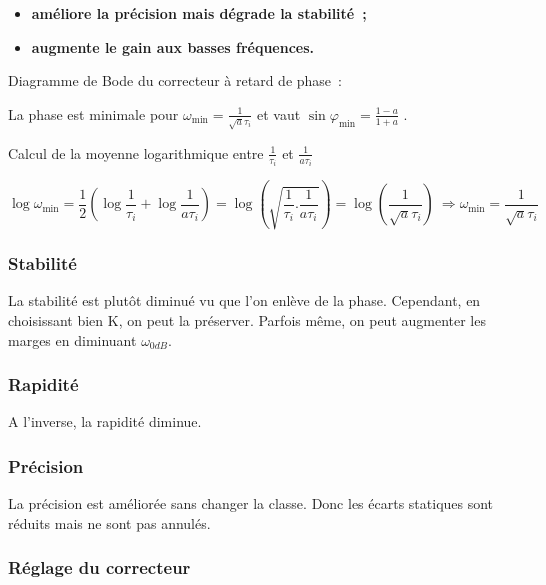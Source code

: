 \begin{itemize}
\item
  \textbf{améliore la précision mais dégrade la stabilité~;}
\item
  \textbf{augmente le gain aux basses fréquences.}
\end{itemize}

Diagramme de Bode du correcteur à retard de phase~:

La phase est minimale pour \(\omega_{\min} = \frac{1}{\sqrt{a}\tau_{i}}\) et vaut \(\sin\varphi_{\min} = \frac{1 - a}{1 + a}\) .

Calcul de la moyenne logarithmique entre \(\frac{1}{\tau_{i}}\) et \(\frac{1}{a\tau_{i}}\)

\[\log\omega_{\min} = \frac{1}{2}\left( \log\frac{1}{\tau_{i}} + \log\frac{1}{a\tau_{i}} \right) = \log\left( \sqrt{\frac{1}{\tau_{i}}.\frac{1}{a\tau_{i}}} \right) = \log\left( \frac{1}{\sqrt{a}\tau_{i}} \right)\  \Rightarrow \omega_{\min} = \frac{1}{\sqrt{a}\tau_{i}}\]

\hypertarget{stabilituxe9-3}{%
\subsubsection*{Stabilité}\label{stabilituxe9-3}}

La stabilité est plutôt diminué vu que l'on enlève de la phase. Cependant, en choisissant bien K, on peut la préserver. Parfois même, on peut augmenter les marges en diminuant \(\omega_{0dB}\).

\hypertarget{rapidituxe9-3}{%
\subsubsection*{Rapidité}\label{rapidituxe9-3}}

A l'inverse, la rapidité diminue.

\hypertarget{pruxe9cision-3}{%
\subsubsection*{Précision}\label{pruxe9cision-3}}

La précision est améliorée sans changer la classe. Donc les écarts statiques sont réduits mais ne sont pas annulés.

\hypertarget{ruxe9glage-du-correcteur-1}{%
\subsubsection*{Réglage du correcteur}\label{ruxe9glage-du-correcteur-1}}

